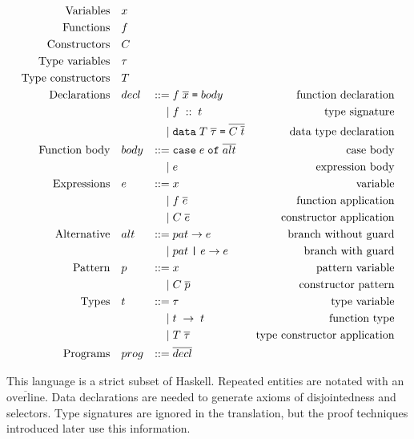 \begin{equation*}
\begin{aligned}
\text{Variables} \quad & x \\
\text{Functions} \quad & f \\
\text{Constructors} \quad & C \\
\text{Type variables} \quad & \tau \\
\text{Type constructors} \quad & T \\
\defBNF{Declarations}{decl}{ f \; \overline{x} \; \hs{=} \; body}{function declaration} \\
    \defaltBNF{f \; :: \; t}{type signature} \\
    \defaltBNF{\hs{data} \; T \; \overline{\tau} \; \hs{=} \; \overline{C \; \overline{t}}}{data type declaration} \\
\defBNF{Function body}{body}{\hs{case} \; e \; \hs{of} \; \overline{alt}}{case body} \\
    \defaltBNF{e}{expression body} \\
\defBNF{Expressions}{e}{x}{variable} \\
    \defaltBNF{f \; \overline{e}}{function application} \\
    \defaltBNF{C \; \overline{e}}{constructor application} \\
\defBNF{Alternative}{alt}{pat \rightarrow e}{branch without guard} \\
    \defaltBNF{pat \; \hs{|} \; e \rightarrow e}{branch with guard} \\
\defBNF{Pattern}{p}{x}{pattern variable} \\
    \defaltBNF{C \; \overline{p}}{constructor pattern} \\
\defBNF{Types}{t}{\tau}{type variable} \\
    \defaltBNF{t \; \rightarrow \; t}{function type} \\
    \defaltBNF{T \; \overline{\tau}}{type constructor application} \\
\defBNF{Programs}{prog}{\overline{decl}}{} \\
\end{aligned}
\end{equation*}

This language is a strict subset of Haskell. Repeated entities are
notated with an $\overline{\text{overline}}$.  Data declarations are
needed to generate axioms of disjointedness and selectors. Type
signatures are ignored in the translation, but the proof techniques
introduced later use this information.

